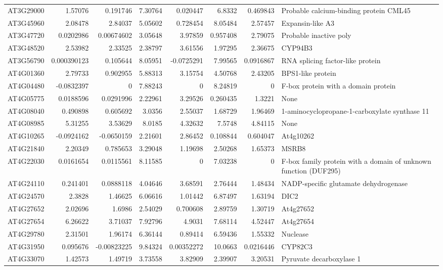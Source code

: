 \documentclass[11pt]{article}
\begin{document}
\begin{center}
\begin{tabular}{lrrrrrrl}
AT3G29000 & 1.57076 & 0.191746 & 7.30764 & 0.020447 & 6.8332 & 0.469843 & Probable calcium-binding protein CML45\\
AT3G45960 & 2.08478 & 2.84037 & 5.05602 & 0.728454 & 8.05484 & 2.57457 & Expansin-like A3\\
AT3G47720 & 0.0202986 & 0.00674602 & 3.05648 & 3.97859 & 0.957408 & 2.79075 & Probable inactive poly\\
AT3G48520 & 2.53982 & 2.33525 & 2.38797 & 3.61556 & 1.97295 & 2.36675 & CYP94B3\\
AT3G56790 & 0.000390123 & 0.105644 & 8.05951 & -0.0725291 & 7.99565 & 0.0916867 & RNA splicing factor-like protein\\
AT4G01360 & 2.79733 & 0.902955 & 5.88313 & 3.15754 & 4.50768 & 2.43205 & BPS1-like protein\\
AT4G04480 & -0.0832397 & 0 & 7.88243 & 0 & 8.24819 & 0 & F-box protein with a domain protein\\
AT4G05775 & 0.0188596 & 0.0291996 & 2.22961 & 3.29526 & 0.260435 & 1.3221 & None\\
AT4G08040 & 0.490898 & 0.605692 & 3.0356 & 2.55037 & 1.68729 & 1.96469 & 1-aminocyclopropane-1-carboxylate synthase 11\\
AT4G08985 & 5.31255 & 3.53629 & 8.0185 & 4.32632 & 7.5748 & 4.84115 & None\\
AT4G10265 & -0.0924162 & -0.0650159 & 2.21601 & 2.86452 & 0.108844 & 0.604047 & At4g10262\\
AT4G21840 & 2.20349 & 0.785653 & 3.29048 & 1.19698 & 2.50268 & 1.65373 & MSRB8\\
AT4G22030 & 0.0161654 & 0.0115561 & 8.11585 & 0 & 7.03238 & 0 & F-box family protein with a domain of unknown function (DUF295)\\
AT4G24110 & 0.241401 & 0.0888118 & 4.04646 & 3.68591 & 2.76444 & 1.48434 & NADP-specific glutamate dehydrogenase\\
AT4G24570 & 2.3828 & 1.46625 & 6.06616 & 1.01442 & 6.87497 & 1.63194 & DIC2\\
AT4G27652 & 2.02696 & 1.6986 & 2.54029 & 0.700608 & 2.89759 & 1.30719 & At4g27652\\
AT4G27654 & 6.26622 & 3.71037 & 7.92796 & 4.9031 & 7.68114 & 4.52447 & At4g27654\\
AT4G29780 & 2.31501 & 1.96174 & 6.36144 & 0.89414 & 6.59436 & 1.55332 & Nuclease\\
AT4G31950 & 0.095676 & -0.00823225 & 9.84324 & 0.00352272 & 10.0663 & 0.0216446 & CYP82C3\\
AT4G33070 & 1.42573 & 1.49719 & 3.73558 & 3.82909 & 2.39907 & 3.20531 & Pyruvate decarboxylase 1\\

\end{tabular}
\end{center}
\end{document}
